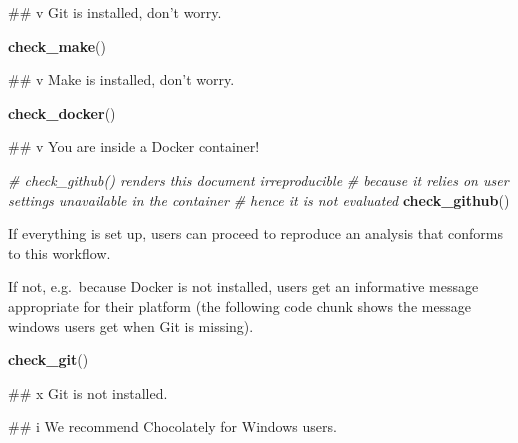 \documentclass[12pt,a4paper,twoside]{article}
\newenvironment{Shaded}{\begin{snugshade}}{\end{snugshade}}
\newcommand{\CommentTok}[1]{\textcolor[rgb]{0.56,0.35,0.01}{\textit{#1}}}
\newcommand{\KeywordTok}[1]{\textcolor[rgb]{0.13,0.29,0.53}{\textbf{#1}}}
\newcommand{\NormalTok}[1]{#1}
\let\oldverbatim\verbatim
\let\endoldverbatim\endverbatim
\renewenvironment{verbatim}{\footnotesize\oldverbatim}{\endoldverbatim}
\begin{document}
\begin{verbatim}
## v Git is installed, don't worry.
\end{verbatim}

\begin{Shaded}
\begin{Highlighting}[]
\KeywordTok{check_make}\NormalTok{()}
\end{Highlighting}
\end{Shaded}

\begin{verbatim}
## v Make is installed, don't worry.
\end{verbatim}

\begin{Shaded}
\begin{Highlighting}[]
\KeywordTok{check_docker}\NormalTok{()}
\end{Highlighting}
\end{Shaded}

\begin{verbatim}
## v You are inside a Docker container!
\end{verbatim}

\begin{Shaded}
\begin{Highlighting}[]
\CommentTok{# check_github() renders this document irreproducible}
\CommentTok{# because it relies on user settings unavailable in the container}
\CommentTok{# hence it is not evaluated}
\KeywordTok{check_github}\NormalTok{()}
\end{Highlighting}
\end{Shaded}

If everything is set up, users can proceed to reproduce an analysis that conforms to this workflow.

If not, e.g.~because Docker is not installed, users get an informative message appropriate for their platform (the following code chunk shows the message windows users get when Git is missing).

\begin{Shaded}
\begin{Highlighting}[]
\KeywordTok{check_git}\NormalTok{()}
\end{Highlighting}
\end{Shaded}

\begin{verbatim}
## x Git is not installed.
\end{verbatim}

\begin{verbatim}
## i We recommend Chocolately for Windows users.
\end{verbatim}
\end{document}
